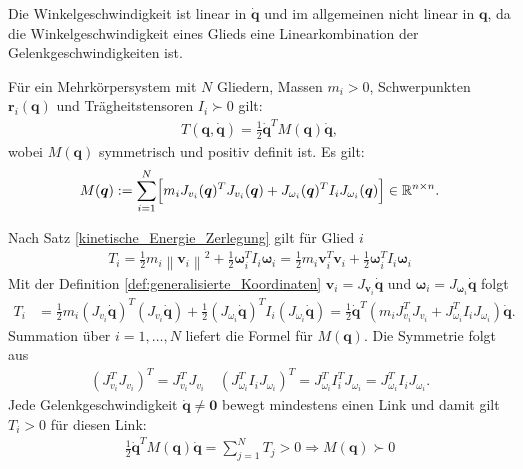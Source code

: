 \documentclass[a4paper, 12pt]{scrartcl}
\newcommand{\norm}[1]{\left\lVert#1\right\lVert}
\begin{document}
Die Winkelgeschwindigkeit ist linear in $\bm{\dot{q}}$ und im allgemeinen 
nicht linear in $\bm{q}$, da die Winkelgeschwindigkeit eines Glieds
eine Linearkombination der Gelenkgeschwindigkeiten ist.
\begin{satz}\label{def:massenmatrix}
    Für ein Mehrkörpersystem mit $N$ Gliedern, Massen $m_i>0$, Schwerpunkten
    $\bm{r}_i(\bm{q})$ und Trägheitstensoren $I_i \succ 0$ gilt:
    \begin{align*}
        T(\bm{q},\bm{\dot{q}})
        =
        \frac{1}{2} \bm{\dot{q}}^T M(\bm{q}) \bm{\dot{q}},
    \end{align*}
    wobei $M(\bm{q})$  symmetrisch und positiv definit ist. Es gilt:
    \begin{align*}
        M(\bm{q})
        :=
        \sum_{i=1}^N
        \Bigl[
            m_i J_{v_i}(\bm{q})^T J_{v_i}(\bm{q})
            + J_{\omega_i}(\bm{q})^T I_i J_{\omega_i}(\bm{q})
        \Bigr]
        \in \mathbb{R}^{n \times n}.
    \end{align*}
\end{satz}

\begin{beweis}
    Nach Satz \ref{kinetische_Energie_Zerlegung} gilt für Glied $i$
    \begin{align*}
        T_i
        =
        \frac{1}{2} m_i \norm{\bm{v}_i}^2
        + \frac{1}{2} \bm{\omega}_i^T I_i \bm{\omega}_i
        =
        \frac{1}{2} m_i \bm{v}_i^T \bm{v}_i
        + \frac{1}{2} \bm{\omega}_i^T I_i \bm{\omega}_i
    \end{align*}
    Mit der Definition \ref{def:generalisierte_Koordinaten}  
    $\bm{v}_i = J_{\bm{v}_i} \bm{\dot{q}}$ und 
    $\bm{\omega}_i = J_{\bm{\omega}_i} \bm{\dot{q}}$
    folgt
    \begin{align*}
        T_i
        &=
        \frac{1}{2} m_i
        (J_{v_i}\bm{\dot{q}})^T 
        (J_{v_i}\bm{\dot{q}})
        + 
        \frac{1}{2}
        (J_{\omega_i}\bm{\dot{q}})^T I_i (J_{\omega_i}\bm{\dot{q}})
        =
        \frac{1}{2} \bm{\dot{q}}^T
        \left(
            m_i J_{v_i}^T J_{v_i} + J_{\omega_i}^T I_i J_{\omega_i}
        \right)
        \bm{\dot{q}}.
    \end{align*}
    Summation über $i = 1,\dots,N$ liefert die Formel für $M(\bm{q})$.
    Die Symmetrie folgt aus
    \begin{align*}
        (J_{v_i}^T J_{v_i})^T 
        = 
        J_{v_i}^T J_{v_i}
        \quad
        (J_{\omega_i}^T I_i J_{\omega_i})^T
        = 
        J_{\omega_i}^T I_i^T J_{\omega_i}
        = 
        J_{\omega_i}^T I_i J_{\omega_i}.
    \end{align*}
    Jede Gelenkgeschwindigkeit $\bm{\dot{q}} \neq \bm{0}$ bewegt mindestens einen 
    Link und damit gilt $T_i> 0$ für diesen Link:
    \begin{align*}
        \frac{1}{2} \bm{\dot{q}}^T M(\bm{q}) \bm{\dot{q}} 
        =
        \sum_{j=1}^{N} T_j
        > 0 
        \Rightarrow M(\bm{q}) \succ 0 
    \end{align*}
\end{beweis}
    
\end{document}
